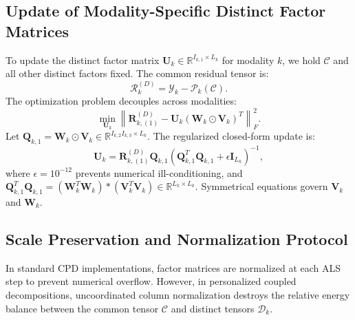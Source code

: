\documentclass[11pt,a4paper]{article}
\begin{document}
\subsection{Update of Modality-Specific Distinct Factor Matrices}
To update the distinct factor matrix $\mathbf{U}_k \in \mathbb{R}^{I_{k,1} \times L_k}$ for modality $k$, we hold $\bm{\mathcal{C}}$ and all other distinct factors fixed. The common residual tensor is:
\begin{equation}
\bm{\mathcal{R}}_k^{(D)} = \bm{\mathcal{Y}}_k - \bm{\mathcal{P}}_k(\bm{\mathcal{C}}).
\end{equation}
The optimization problem decouples across modalities:
\begin{equation}
\min_{\mathbf{U}_k} \left\| \mathbf{R}_{k,(1)}^{(D)} - \mathbf{U}_k (\mathbf{W}_k \odot \mathbf{V}_k)^T \right\|_F^2.
\end{equation}
Let $\mathbf{Q}_{k,1} = \mathbf{W}_k \odot \mathbf{V}_k \in \mathbb{R}^{I_{k,2} I_{k,3} \times L_k}$. The regularized closed-form update is:
\begin{equation}
\mathbf{U}_k = \mathbf{R}_{k,(1)}^{(D)} \mathbf{Q}_{k,1} \left( \mathbf{Q}_{k,1}^T \mathbf{Q}_{k,1} + \epsilon \mathbf{I}_{L_k} \right)^{-1},
\label{eq:update_U}
\end{equation}
where $\epsilon = 10^{-12}$ prevents numerical ill-conditioning, and $\mathbf{Q}_{k,1}^T \mathbf{Q}_{k,1} = (\mathbf{W}_k^T \mathbf{W}_k) * (\mathbf{V}_k^T \mathbf{V}_k) \in \mathbb{R}^{L_k \times L_k}$. Symmetrical equations govern $\mathbf{V}_k$ and $\mathbf{W}_k$.

\subsection{Scale Preservation and Normalization Protocol}
In standard CPD implementations, factor matrices are normalized at each ALS step to prevent numerical overflow. However, in personalized coupled decompositions, uncoordinated column normalization destroys the relative energy balance between the common tensor $\bm{\mathcal{C}}$ and distinct tensors $\bm{\mathcal{D}}_k$. 
\end{document}
